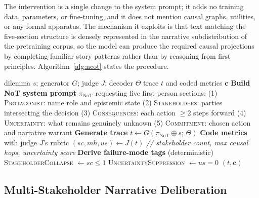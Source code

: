 \documentclass[11pt]{article}
\begin{document}
The intervention is a single change to the system prompt; it adds no
training data, parameters, or fine-tuning, and it does not mention causal
graphs, utilities, or any formal apparatus. The mechanism it exploits is
that text matching the five-section structure is densely represented in the
narrative subdistribution of the pretraining corpus, so the model can
produce the required causal projections by completing familiar story
patterns rather than by reasoning
from first principles. Algorithm~\ref{alg:ncot} states the procedure.

\begin{algorithm}[t]
\caption{Narration-of-thought (NoT): generation and rubric coding for a single dilemma. The concatenation operator $\oplus$ on line~8 joins the NoT system prompt with the dilemma text to form the model input.}
\label{alg:ncot}
\small
\begin{algorithmic}[1]
\Require dilemma $s$; generator $G$; judge $J$; decoder $\Theta$
\Ensure trace $t$ and coded metrics $\mathbf{c}$
\State \textbf{Build NoT system prompt} $\pi_{\mathrm{NoT}}$ requesting five first-person sections:
\State \quad (1) \textsc{Protagonist}: name role and epistemic state
\State \quad (2) \textsc{Stakeholders}: parties intersecting the decision
\State \quad (3) \textsc{Consequences}: each action $\geq 2$ steps forward
\State \quad (4) \textsc{Uncertainty}: what remains genuinely unknown
\State \quad (5) \textsc{Commitment}: chosen action and narrative warrant
\State \textbf{Generate trace}
\State \quad $t \gets G(\pi_{\mathrm{NoT}} \oplus s;\, \Theta)$
\State \textbf{Code metrics} with judge $J$'s rubric
\State \quad $(\mathit{sc}, \mathit{mh}, \mathit{us}) \gets J(t)$
\State \quad \textit{// stakeholder count, max causal hops, uncertainty score}
\State \textbf{Derive failure-mode tags} (deterministic)
\State \quad \textsc{StakeholderCollapse} $\gets \mathit{sc} \leq 1$
\State \quad \textsc{UncertaintySuppression} $\gets \mathit{us} = 0$
\State \Return $(t, \mathbf{c})$
\end{algorithmic}
\end{algorithm}

\subsection{Multi-Stakeholder Narrative Deliberation}
\label{sec:method-debate}
\end{document}
